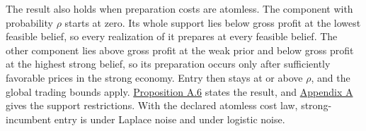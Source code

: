The result also holds when preparation costs are atomless.
The component with probability \(\rho\) starts at zero.
Its whole support lies below gross profit at the lowest feasible belief, so every
realization of it prepares at every feasible belief.
The other component lies above gross profit at the weak prior and below gross profit at the
highest strong belief, so its preparation occurs only after sufficiently favorable prices in
the strong economy.
Entry then stays at or above \(\rho\), and the global trading bounds apply.
\hyperref[result-proposition-a-6]{Proposition A.6} states the result,
and \hyperref[paper-appendix]{Appendix A} gives the support
restrictions. With the declared atomless cost law, strong-incumbent entry
is  under Laplace noise and  under logistic noise.
